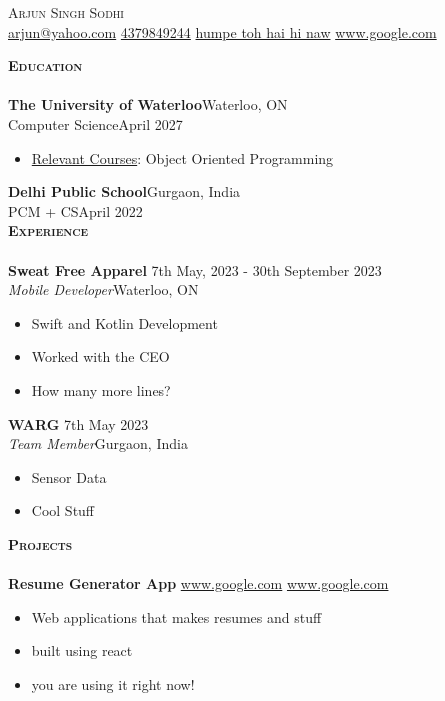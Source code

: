 \documentclass[a4paper]{article}
\newcommand{\lineunder} {
    \vspace*{-8pt} \\
    \hspace*{-18pt} \hrulefill \\
}
\newcommand{\header} [1] {
    {\hspace*{-18pt}\vspace*{6pt} \textsc{#1}}
    \vspace*{-6pt} \lineunder
}
\begin{document}
\vspace*{-40pt} 

\vspace*{-10pt}
        \begin{center}
        {\Huge \scshape Arjun Singh Sodhi} \vspace{2pt} \\
        \href{mailto:arjun@yahoo.com}{arjun@yahoo.com}
        \vline \hspace{.5pt} \href{tel:4379849244}{4379849244} 
 \vline \hspace{.5pt} \href{humpe toh hai hi naw}{humpe toh hai hi naw} 
 \vline \hspace{.5pt} \href{www.google.com}{www.google.com} 
\end{center} 
\header{\textbf{Education}} 
\textbf{The University of Waterloo}\hfill Waterloo, ON\\ 
Computer Science\hfill April 2027\\ 
\begin{itemize} \itemsep 0pt 
 \item{\underline{Relevant Courses}: Object Oriented Programming} 
 \end{itemize} 
\textbf{Delhi Public School}\hfill Gurgaon, India\\ 
PCM + CS\hfill April 2022\\ 
\header{\textbf{Experience}} 
\textbf{Sweat Free Apparel} \hfill 7th May, 2023 - 30th September 2023\\ 
\textit{Mobile Developer}\hfill Waterloo, ON\\ 
\begin{itemize} \itemsep 0pt 
\item{Swift and Kotlin Development} 
\item{Worked with the CEO} 
\item{How many more lines?} 
\end{itemize} 
\textbf{WARG} \hfill 7th May 2023\\ 
\textit{Team Member}\hfill Gurgaon, India\\ 
\begin{itemize} \itemsep 0pt 
\item{Sensor Data} 
\item{Cool Stuff} 
\end{itemize} 
\header{\textbf{Projects}} 
\textbf{Resume Generator App} \vline \; \url{www.google.com}\; \vline \; \url{www.google.com}\\ 
\begin{itemize} \itemsep 0pt 
\item{Web applications that makes resumes and stuff} 
\item{built using react} 
\item{you are using it right now!} 
\end{itemize} 
\end{document}

